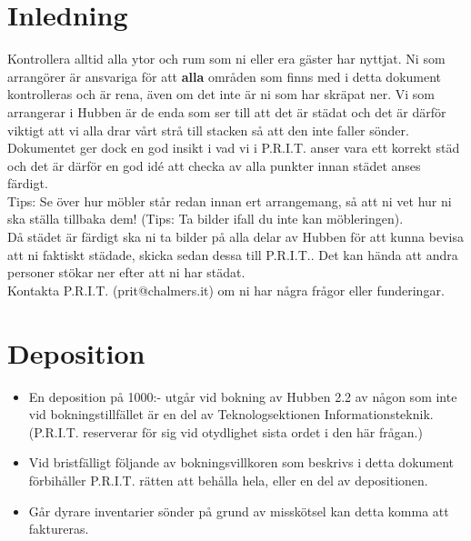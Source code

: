 \newcommand{\deposition}{1000}

\section{Inledning}
Kontrollera alltid alla ytor och rum som ni eller era gäster har nyttjat. Ni som arrangörer är ansvariga för att \textbf{alla} områden som finns med i detta dokument kontrolleras och är rena, även om det inte är ni som har skräpat ner. Vi som arrangerar i Hubben är de enda som ser till att det är städat och det är därför viktigt att vi alla drar vårt strå till stacken så att den inte faller sönder.\\

 Dokumentet ger dock en god insikt i vad vi i P.R.I.T. anser vara ett korrekt städ och det är därför en god idé att checka av alla punkter innan städet anses färdigt.\\

Tips: Se över hur möbler står redan innan ert arrangemang, så att ni vet hur ni ska ställa tillbaka dem! (Tips: Ta bilder ifall du inte kan möbleringen). \\

Då städet är färdigt ska ni ta bilder på alla delar av Hubben för att kunna bevisa att ni faktiskt städade, skicka sedan dessa till P.R.I.T.. Det kan hända att andra personer stökar ner efter att ni har städat.\\

Kontakta P.R.I.T. (prit@chalmers.it) om ni har några frågor eller funderingar.

\section{Deposition}
\begin{itemize}
    \item En deposition på \deposition :- utgår vid bokning av Hubben 2.2 av någon som inte vid bokningstillfället är en del av Teknologsektionen Informationsteknik. (P.R.I.T. reserverar för sig vid otydlighet sista ordet i den här frågan.)
    \item Vid bristfälligt följande av bokningsvillkoren som beskrivs i detta dokument förbihåller P.R.I.T. rätten att behålla hela, eller en del av depositionen.
    \item Går dyrare inventarier sönder på grund av misskötsel kan detta komma att faktureras.
\end{itemize}

